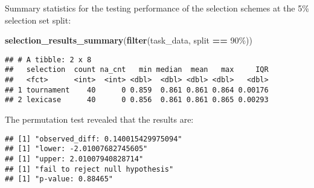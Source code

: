 \documentclass[
]{book}
\newenvironment{Shaded}{\begin{snugshade}}{\end{snugshade}}
\newcommand{\AttributeTok}[1]{\textcolor[rgb]{0.13,0.29,0.53}{#1}}
\newcommand{\DecValTok}[1]{\textcolor[rgb]{0.00,0.00,0.81}{#1}}
\newcommand{\FunctionTok}[1]{\textcolor[rgb]{0.13,0.29,0.53}{\textbf{#1}}}
\newcommand{\NormalTok}[1]{#1}
\newcommand{\OtherTok}[1]{\textcolor[rgb]{0.56,0.35,0.01}{#1}}
\newcommand{\SpecialCharTok}[1]{\textcolor[rgb]{0.81,0.36,0.00}{\textbf{#1}}}
\newcommand{\StringTok}[1]{\textcolor[rgb]{0.31,0.60,0.02}{#1}}
\begin{document}
Summary statistics for the testing performance of the selection schemes at the 5\% selection set split:

\begin{Shaded}
\begin{Highlighting}[]
\FunctionTok{selection\_results\_summary}\NormalTok{(}\FunctionTok{filter}\NormalTok{(task\_data, split }\SpecialCharTok{==} \StringTok{\textquotesingle{}90\%\textquotesingle{}}\NormalTok{))}
\end{Highlighting}
\end{Shaded}

\begin{verbatim}
## # A tibble: 2 x 8
##   selection  count na_cnt   min median  mean   max     IQR
##   <fct>      <int>  <int> <dbl>  <dbl> <dbl> <dbl>   <dbl>
## 1 tournament    40      0 0.859  0.861 0.861 0.864 0.00176
## 2 lexicase      40      0 0.856  0.861 0.861 0.865 0.00293
\end{verbatim}

The permutation test revealed that the results are:

\begin{Shaded}
\end{Shaded}

\begin{verbatim}
## [1] "observed_diff: 0.140015429975094"
## [1] "lower: -2.01007682745605"
## [1] "upper: 2.01007940828714"
## [1] "fail to reject null hypothesis"
## [1] "p-value: 0.88465"
\end{verbatim}
\end{document}
